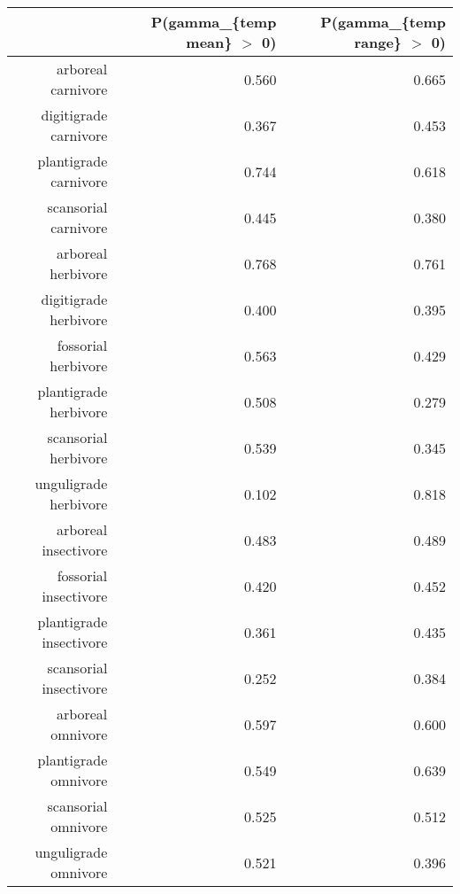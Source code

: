 \begin{table}[ht]
\centering
\begin{tabular}{rrr}
  \hline
 & P(gamma\_\{temp mean\} $>$ 0) & P(gamma\_\{temp range\} $>$ 0) \\ 
  \hline
arboreal carnivore & 0.560 & 0.665 \\ 
  digitigrade carnivore & 0.367 & 0.453 \\ 
  plantigrade carnivore & 0.744 & 0.618 \\ 
  scansorial carnivore & 0.445 & 0.380 \\ 
  arboreal herbivore & 0.768 & 0.761 \\ 
  digitigrade herbivore & 0.400 & 0.395 \\ 
  fossorial herbivore & 0.563 & 0.429 \\ 
  plantigrade herbivore & 0.508 & 0.279 \\ 
  scansorial herbivore & 0.539 & 0.345 \\ 
  unguligrade herbivore & 0.102 & 0.818 \\ 
  arboreal insectivore & 0.483 & 0.489 \\ 
  fossorial insectivore & 0.420 & 0.452 \\ 
  plantigrade insectivore & 0.361 & 0.435 \\ 
  scansorial insectivore & 0.252 & 0.384 \\ 
  arboreal omnivore & 0.597 & 0.600 \\ 
  plantigrade omnivore & 0.549 & 0.639 \\ 
  scansorial omnivore & 0.525 & 0.512 \\ 
  unguligrade omnivore & 0.521 & 0.396 \\ 
   \hline
\end{tabular}
\label{tab:surv_temp}
\end{table}

